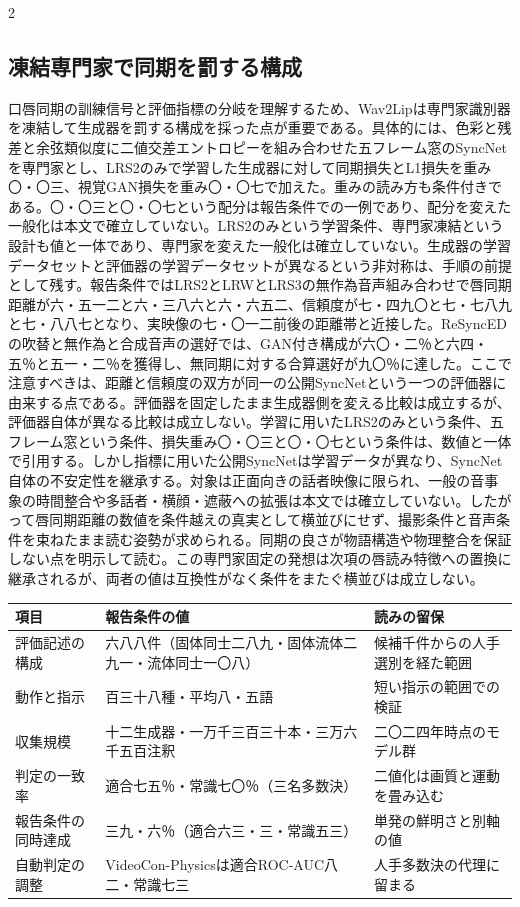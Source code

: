 \documentclass[lualatex,a4paper,10pt]{jlreq}
\begin{document}
\begin{multicols}{2}
\subsection{凍結専門家で同期を罰する構成}
口唇同期の訓練信号と評価指標の分岐を理解するため、Wav2Lipは専門家識別器を凍結して生成器を罰する構成を採った点が重要である。具体的には、色彩と残差と余弦類似度に二値交差エントロピーを組み合わせた五フレーム窓のSyncNetを専門家とし、LRS2のみで学習した生成器に対して同期損失とL1損失を重み〇・〇三、視覚GAN損失を重み〇・〇七で加えた\autocite{btd129}。重みの読み方も条件付きである。〇・〇三と〇・〇七という配分は報告条件での一例であり、配分を変えた一般化は本文で確立していない。LRS2のみという学習条件、専門家凍結という設計も値と一体であり、専門家を変えた一般化は確立していない。生成器の学習データセットと評価器の学習データセットが異なるという非対称は、手順の前提として残す\autocite{btd129}。報告条件ではLRS2とLRWとLRS3の無作為音声組み合わせで唇同期距離が六・五一二と六・三八六と六・六五二、信頼度が七・四九〇と七・七八九と七・八八七となり、実映像の七・〇一二前後の距離帯と近接した。ReSyncEDの吹替と無作為と合成音声の選好では、GAN付き構成が六〇・二％と六四・五％と五一・二％を獲得し、無同期に対する合算選好が九〇％に達した\autocite{btd129}。ここで注意すべきは、距離と信頼度の双方が同一の公開SyncNetという一つの評価器に由来する点である。評価器を固定したまま生成器側を変える比較は成立するが、評価器自体が異なる比較は成立しない。学習に用いたLRS2のみという条件、五フレーム窓という条件、損失重み〇・〇三と〇・〇七という条件は、数値と一体で引用する\autocite{btd129}。しかし指標に用いた公開SyncNetは学習データが異なり、SyncNet自体の不安定性を継承する。対象は正面向きの話者映像に限られ、一般の音事象の時間整合や多話者・横顔・遮蔽への拡張は本文では確立していない。したがって唇同期距離の数値を条件越えの真実として横並びにせず、撮影条件と音声条件を束ねたまま読む姿勢が求められる。同期の良さが物語構造や物理整合を保証しない点を明示して読む。この専門家固定の発想は次項の唇読み特徴への置換に継承されるが、両者の値は互換性がなく条件をまたぐ横並びは成立しない。
\end{multicols}

\begin{center}
\small
\begin{tabularx}{\textwidth}{@{}p{}p{}X@{}}
\toprule
項目 & 報告条件の値 & 読みの留保 \\
\midrule
評価記述の構成 & 六八八件（固体同士二八九・固体流体二九一・流体同士一〇八） & 候補千件からの人手選別を経た範囲 \\
動作と指示 & 百三十八種・平均八・五語 & 短い指示の範囲での検証 \\
収集規模 & 十二生成器・一万千三百三十本・三万六千五百注釈 & 二〇二四年時点のモデル群 \\
判定の一致率 & 適合七五％・常識七〇％（三名多数決） & 二値化は画質と運動を畳み込む \\
報告条件の同時達成 & 三九・六％（適合六三・三・常識五三） & 単発の鮮明さと別軸の値 \\
自動判定の調整 & VideoCon-Physicsは適合ROC-AUC八二・常識七三 & 人手多数決の代理に留まる \\
\bottomrule
\end{tabularx}
\end{center}
\autocite{btd131}
\end{document}
